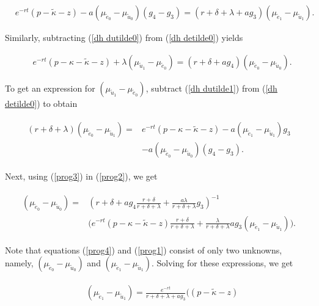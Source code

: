 \documentclass[12pt]{article} %
\theoremstyle{definition}
\begin{document}
\begin{appendix}
\begin{fleqn}
\begin{align}
& e^{-rt}(p-\tilde{\kappa}-z)-a(\mu_{\tilde{e}_0}-\mu_{\tilde{u}_0})(g_4-g_3)=(r+\delta+\lambda+ag_3)(\mu_{\tilde{e}_1}-\mu_{\tilde{u}_1}). \label{prog1}
\end{align}
\end{fleqn}
Similarly, subtracting (\ref{dh dutilde0}) from (\ref{dh detilde0}) yields
\begin{fleqn}
\begin{align}
& e^{-rt}(p-\kappa-\tilde{\kappa}-z)+\lambda(\mu_{\tilde{u}_1}-\mu_{\tilde{e}_0})=(r+\delta+ag_4)(\mu_{\tilde{e}_0}-\mu_{\tilde{u}_0}). \label{prog2}
\end{align}
\end{fleqn}
To get an expression for $(\mu_{\tilde{u}_1}-\mu_{\tilde{e}_0})$, subtract (\ref{dh dutilde1}) from (\ref{dh detilde0}) to obtain
\begin{fleqn}
\begin{align}
\begin{split}
(r+\delta+\lambda)(\mu_{\tilde{e}_0}-\mu_{\tilde{u}_1})= & e^{-rt}(p-\kappa-\tilde{\kappa}-z)-a(\mu_{\tilde{e}_1}-\mu_{\tilde{u}_1})g_3\\
& -a(\mu_{\tilde{e}_0}-\mu_{\tilde{u}_0})(g_4-g_3). \label{prog3}
\end{split}
\end{align}
\end{fleqn}
Next, using (\ref{prog3}) in (\ref{prog2}), we get
\begin{fleqn}
\begin{align}
\begin{split}
(\mu_{\tilde{e}_0}-\mu_{\tilde{u}_0})=& \left(r+\delta+ag_4\frac{r+\delta}{r+\delta+\lambda}+\frac{a\lambda}{r+\delta+\lambda}g_3\right)^{-1}\\
&\biggl(e^{-rt}(p-\kappa-\tilde{\kappa}-z)\frac{r+\delta}{r+\delta+\lambda} +\frac{\lambda}{r+\delta+\lambda}ag_3(\mu_{\tilde{e}_1}-\mu_{\tilde{u}_1})\biggr). \label{prog4}
\end{split}
\end{align}
\end{fleqn}
Note that equations (\ref{prog4}) and (\ref{prog1}) consist of only two unknowns, namely, $(\mu_{\tilde{e}_0}-\mu_{\tilde{u}_0})$ and $(\mu_{\tilde{e}_1}-\mu_{\tilde{u}_1})$. Solving for these expressions, we get
\begin{fleqn}
\begin{align}
\begin{split}
&(\mu_{\tilde{e}_1}-\mu_{\tilde{u}_1})=\frac{e^{-rt}}{r+\delta+\lambda+ag_3}\biggl((p-\tilde{\kappa}-z)\\

\end{split}
\end{align}
\end{fleqn}
\end{appendix}
\end{document}
